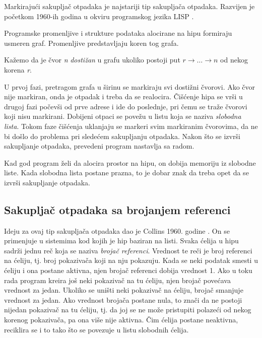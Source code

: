 Markirajući sakupljač otpadaka je najstariji tip sakupljača otpadaka. Razvijen je početkom 1960-ih godina u okviru programskog jezika LISP \cite{mcca60}.

Programske promenljive i strukture podataka alocirane na hipu formiraju usmeren graf. Promenljive predstavljaju koren tog grafa.

\begin{definicija}
	Kažemo da je čvor \textit{n} \textit{dostižan} u grafu ukoliko postoji put $r\rightarrow \dots \rightarrow n$ od nekog korena \textit{r}.
\end{definicija}

U prvoj fazi, pretragom grafa u širinu se markiraju svi dostižni čvorovi. Ako čvor nije markiran, onda je otpadak i treba da se realocira. Čišćenje hipa se vrši u drugoj fazi počevši od prve adrese i ide do poslednje, pri čemu se traže čvorovi koji nisu markirani. Dobijeni otpaci se povežu u listu koja se naziva \textit{slobodna lista}. Tokom faze čišćenja uklanjaju se markeri svim markiranim čvorovima, da ne bi došlo do problema pri sledećem sakupljanju otpadaka. Nakon što se izvrši sakupljanje otpadaka, prevedeni program nastavlja sa radom.

Kad god program želi da alocira prostor na hipu, on dobija memoriju iz slobodne liste. Kada slobodna lista postane prazna, to je dobar znak da treba opet da se izvrši sakupljanje otpadaka.

\subsection{Sakupljač otpadaka sa brojanjem referenci}
\label{ref:reference counter}

Ideju za ovaj tip sakupljača otpadaka dao je Collins 1960. godine \cite{col60}. On se primenjuje u sistemima kod kojih je hip baziran na listi. Svaka ćelija u hipu sadrži jednu reč koja se naziva \textit{brojač referenci}. Vrednost te reči je broj referenci na ćeliju, tj. broj pokazivača koji na nju pokazuju. Kada se neki podatak smesti u ćeliju i ona postane aktivna, njen brojač referenci dobija vrednost 1. Ako u toku rada program kreira još neki pokazivač na tu ćeliju, njen brojač povećava vrednost za jedan. Ukoliko se uništi neki pokazivač na ćeliju, brojač smanjuje vrednost za jedan. Ako vrednost brojača postane nula, to znači da ne postoji nijedan pokazivač na tu ćeliju, tj. da joj se ne može pristupiti polazeći od nekog korenog pokazivača, pa ona više nije aktivna. Čim ćelija postane neaktivna, reciklira se i to tako što se povezuje u listu slobodnih ćelija.

